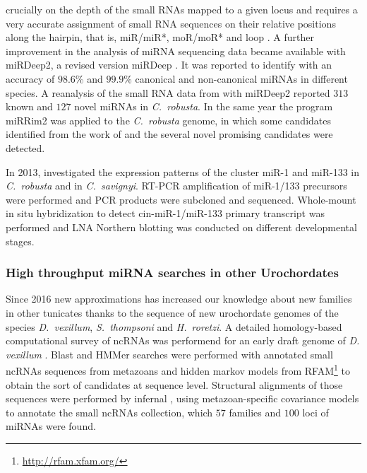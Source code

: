 \documentclass[graybox]{svmult}
\begin{document}
crucially on the depth of the small RNAs mapped to a given locus and
requires a very accurate assignment of small RNA sequences on their
relative positions along the hairpin, that is, miR/miR*, moR/moR* and loop
\cite{Hendrix2010}. A further improvement in the analysis of miRNA
sequencing data became available with miRDeep2, a revised version miRDeep
\cite{Friedlaender:12}.  It was reported to identify with an accuracy of
$98.6$\% and $99.9$\% canonical and non-canonical miRNAs in different
species. A reanalysis of the small RNA data from \cite{Shi2009} with
miRDeep2 reported $313$ known and $127$ novel miRNAs in \textit{C.\
  robusta}. In the same year the program miRRim2 \cite{Terai2012} was
applied to the \textit{C.\ robusta} genome, in which some candidates
identified from the work of \cite{Hendrix2010} and the several novel promising
candidates were detected.

In 2013, \cite{Kusakabe2013} investigated the expression patterns of the
cluster miR-1 and miR-133 in \textit{C.\ robusta} and in \textit{C.\
  savignyi}. RT-PCR amplification of miR-1/133 precursors were performed
and PCR products were subcloned and sequenced. Whole-mount in situ
hybridization to detect cin-miR-1/miR-133 primary transcript was performed
and LNA Northern blotting was conducted on different developmental stages.

\subsubsection{High throughput miRNA searches in other Urochordates}

Since 2016 new approximations has increased our knowledge about new
families in other tunicates thanks to the sequence of new urochordate
genomes of the species \textit{D.\ vexillum}, \textit{S.\ thompsoni} and
\textit{H.\ roretzi}. A detailed homology-based computational survey of ncRNAs
was performend for an early draft genome of \textit{D. vexillum}
\cite{Velandia-Huerto2016}.  Blast and HMMer searches were performed with
annotated small ncRNAs sequences from metazoans and hidden markov models
from RFAM\footnote{\url{http://rfam.xfam.org/}} to obtain the sort of
candidates at sequence level. Structural alignments of those sequences were
performed by infernal \cite{Nawrocki:2013}, using metazoan-specific
covariance models to annotate the small ncRNAs collection, which $57$
families and $100$ loci of miRNAs were found.
\end{document}
